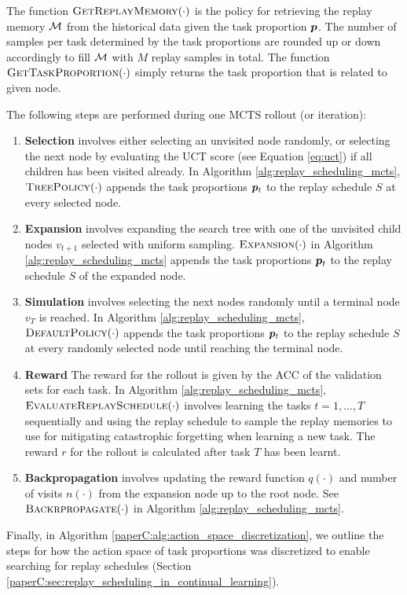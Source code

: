 The function $\textsc{GetReplayMemory}(\cdot)$ is the policy for retrieving the replay memory ${\mathcal{M}}$ from the historical data given the task proportion ${\bm{p}}$. The number of samples per task determined by the task proportions are rounded up or down accordingly to fill ${\mathcal{M}}$ with $M$ replay samples in total. 
The function $\textsc{GetTaskProportion}(\cdot)$ simply returns the task proportion that is related to given node. 


The following steps are performed during one MCTS rollout (or iteration):
\begin{enumerate}[leftmargin=*, topsep=0pt]
	\item {\bf Selection} involves either selecting an unvisited node randomly, or selecting the next node by evaluating the UCT score (see Equation \ref{eq:uct}) if all children has been visited already. In Algorithm \ref{alg:replay_scheduling_mcts}, $\textsc{TreePolicy}(\cdot)$ appends the task proportions ${\bm{p}}_t$ to the replay schedule $S$ at every selected node. 
	
	\item {\bf Expansion} involves expanding the search tree with one of the unvisited child nodes $v_{t+1}$ selected with uniform sampling. $\textsc{Expansion}(\cdot)$ in Algorithm \ref{alg:replay_scheduling_mcts} appends the task proportions ${\bm{p}}_t$ to the replay schedule $S$ of the expanded node. 
	
	\item {\bf Simulation} involves selecting the next nodes randomly until a terminal node $v_T$ is reached. In Algorithm \ref{alg:replay_scheduling_mcts}, $\textsc{DefaultPolicy}(\cdot)$ appends the task proportions ${\bm{p}}_t$ to the replay schedule $S$ at every randomly selected node until reaching the terminal node.  
	
	\item {\bf Reward} The reward for the rollout is given by the ACC of the validation sets for each task. In Algorithm \ref{alg:replay_scheduling_mcts}, $\textsc{EvaluateReplaySchedule}(\cdot)$ involves learning the tasks $t= 1, \dots, T$ sequentially and using the replay schedule to sample the replay memories to use for mitigating catastrophic forgetting when learning a new task. The reward $r$ for the rollout is calculated after task $T$ has been learnt. 
	
	\item {\bf Backpropagation} involves updating the reward function $q(\cdot)$ and number of visits $n(\cdot)$ from the expansion node up to the root node. See $\textsc{Backrpropagate}(\cdot)$ in Algorithm \ref{alg:replay_scheduling_mcts}.
\end{enumerate}
Finally, in Algorithm \ref{paperC:alg:action_space_discretization}, we outline the steps for how the action space of task proportions was discretized to enable searching for replay schedules (Section \ref{paperC:sec:replay_scheduling_in_continual_learning}). 


